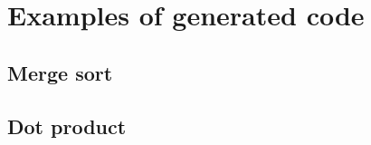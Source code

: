 \appendix
\chapter{Examples of generated code} \label{chap:egc}
\section{Merge sort}
\section{Dot product}
